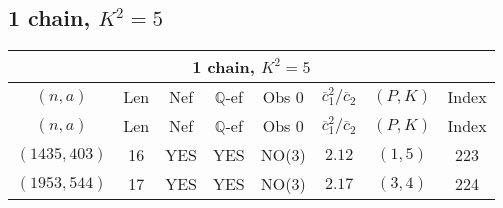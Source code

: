 \subsection{1 chain, $K^2 = 5$}
\begin{longtable}{|c|c|c|c|c|c|c|c|}
\hline
\multicolumn{8}{|c|}{1 chain, $K^2 = 5$}\\
\hline
$(n,a)$ & Len & Nef & $\mathbb Q$-ef & Obs 0 & $\overline c_1^2 / \overline c_2$ & $(P,K)$ & Index\\
\hline
\endfirsthead

\hline
$(n,a)$ & Len & Nef & $\mathbb Q$-ef & Obs 0 & $\overline c_1^2 / \overline c_2$ & $(P,K)$ & Index\\
\hline
\endhead
\hline
\endfoot

$(1435,403)$ & 16 & YES & YES & NO(3) & $2.12$ & $(1,5)$ & 223\\
$(1953,544)$ & 17 & YES & YES & NO(3) & $2.17$ & $(3,4)$ & 224
\end{longtable}
